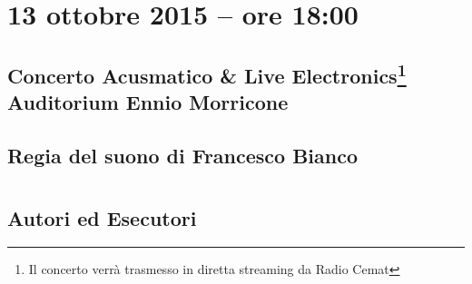 \documentclass[8pt, twoside, a5paper]{extreport}
\begin{document}
\vspace{7mm}

\begin{multicols}{2}




\end{multicols}

\clearpage

\section*{13 ottobre 2015 -- ore 18:00}

\subsection*{{\small Concerto Acusmatico \& Live Electronics\footnote{ Il concerto verrà trasmesso in diretta streaming da Radio Cemat}} \\
	\textsf{Auditorium Ennio Morricone}}

{\fontsize{30}{30} }

\subsection*{\textsf{Regia del suono di Francesco Bianco}}

\bigskip

\begin{multicols}{2}




\end{multicols}

\clearpage





\section*{ }

\subsection*{\textsf{Autori ed Esecutori}\\}
\end{document}

